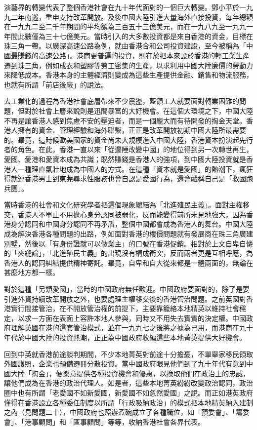 演藝界的轉變代表了整個香港社會在九十年代面對的一個巨大轉變。鄧小平於一九九二年南巡，重申支持改革開放。及後中國大陸引進大量海外直接投資，每年總額在一九九二至二千年期間的平均額為三百五十三億美元，而在一九八九至一九九一年間此數僅為三十七億美元。當時引入的大多數投資都是來自香港的資金，目標在珠三角一帶。以廣深高速公路為例，就由香港合和公司投資建設，至今被稱為「中國最賺錢的高速公路」。港商更普遍的投資，則在於把本來設於香港的輕工業生產遷到珠三角，例如成衣和塑膠等勞工密集的生產，以求利用中國大陸廉價的勞動力來降低成本。香港本身的主體經濟則變成為這些生產提供金融、銷售和物流服務，也就有所謂「前店後廠」的說法。

去工業化的過程為香港社會底層帶來不少震盪，藍領工人就要面對轉業困難的問題，但對於社會上層來說則是迅間暴富的大好機會。在這個大環境之下，中國大陸不再是讓香港人感到焦慮不安的壓迫者，而是一個龐大而有待開發的掏金天堂。香港人擁有的資金、管理經驗和海外聯繫，正正是改革開放初期中國大陸所最需要的。畢竟，這時候歐美國家的資金尚未大規模進入中國大陸，香港資本扮演起先行者的角色。在此，香港一直以來「從邊陲改變中國」的地位得到另一次轉世再生，愛國、愛港和愛資本成為共識；既然賺錢是香港人的強項，到中國大陸投資就是香港人一種理直氣壯地成為中國人的方式。在這種「資本就是愛國」的熱潮下，瘋狂得就連香港男士到東莞尋求性服務也會自認是愛國行為，還會戲稱自己是「救國跑兵團」。

當時香港的社會和文化研究學者把這個現象總結為「北進殖民主義」。面對主權移交，香港人不單止不用擔心身分認同被弱化，反而能變得前所未見地強大，因為香港身分認同和中國身分認同不再矛盾，整個中國都會成為香港人的舞台。中國大陸成為解決香港各種問題的出路，例如面對香港的樓價問題就有發展商在珠三角廣建別墅，然後以「有身份證就可以做業主」的口號在香港促銷。相對於上文自卑自憐的「夾縫論」，「北進殖民主義」的出現沒有構成衝突，反而兩者更是互相呼應，為香港人的認同糾結提供精神寄託。畢竟，自卑和自大從來都是一體兩面的，無論在甚麼地方都一樣。

對於這種「另類愛國」，當時的中國政府無任歡迎。中國政府要面對的，除了是要引進外資持續改革開放之外，也要處理主權移交後的香港管治問題。之前英國對香港實行間接管治，在不開放管治權的前提下，主要靠籠絡本地精英以維持社會穩定，以求一方面在表面上容許本地人參與，同時又不用失去實質的決定權。中國政府理解英國在港的這套管治模式，並在一九九七之後將之據為己用，而港商在九十年代於中國大陸的投資熱潮，正正為中國政府收編這些本地菁英提供大好機會。

回到中英就香港前途談判期間，不少本地菁英對前途十分擔憂，不單舉家移民領取外國護照，企業也預備遷冊分散投資。當中國政府眼見他們到了九十年代有意到中國大陸「掏金」，便樂意提供各種投資機會和優惠，以換取他們在政治上的忠誠，讓他們成為在香港的政治代理人。如是者，這些本地菁英紛紛改變政治認同，政治圈中也有所謂「老愛國不如新愛國，新愛國不如忽然愛國」之說。而正如港英政府懂得在香港設立各種委任制度以所謂「行政吸納政治」的模式把本地精英納入建制之內（見問題二十），中國政府也照辦煮碗成立了各種職位，如「預委會」、「籌委會」、「港事顧問」和「區事顧問」等等，收納香港社會各界代表。


